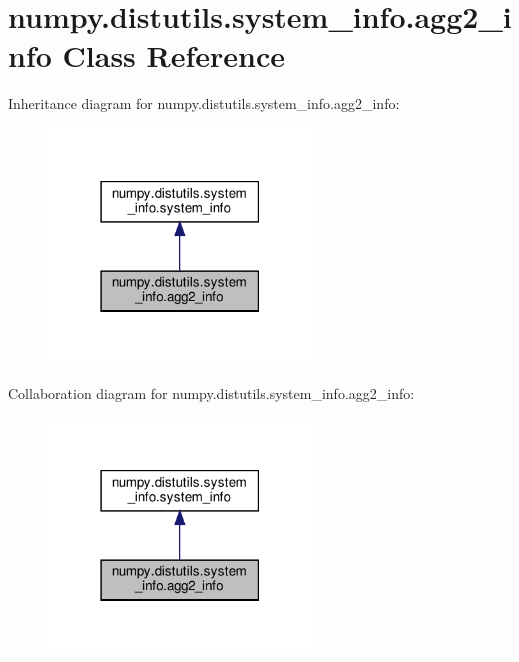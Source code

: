 \hypertarget{classnumpy_1_1distutils_1_1system__info_1_1agg2__info}{}\section{numpy.\+distutils.\+system\+\_\+info.\+agg2\+\_\+info Class Reference}
\label{classnumpy_1_1distutils_1_1system__info_1_1agg2__info}


Inheritance diagram for numpy.\+distutils.\+system\+\_\+info.\+agg2\+\_\+info\+:
\nopagebreak
\begin{figure}[H]
\begin{center}
\leavevmode
\includegraphics[width=198pt]{classnumpy_1_1distutils_1_1system__info_1_1agg2__info__inherit__graph}
\end{center}
\end{figure}


Collaboration diagram for numpy.\+distutils.\+system\+\_\+info.\+agg2\+\_\+info\+:
\nopagebreak
\begin{figure}[H]
\begin{center}
\leavevmode
\includegraphics[width=198pt]{classnumpy_1_1distutils_1_1system__info_1_1agg2__info__coll__graph}
\end{center}
\end{figure}
